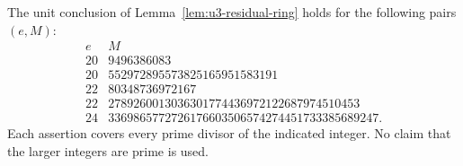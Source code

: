 \begin{proposition}\label{prop:u3-minus7-higher3}
The unit conclusion of Lemma~\ref{lem:u3-residual-ring} holds for
the following pairs $(e,M)$:
\[
 \begin{array}{c|l}
 e&M\\ \hline
 20&9496386083\\
 20&552972895573825165951583191\\
 22&80348736972167\\
 22&2789260013036301774436972122687974510453\\
 24&3369865772726176603506574274451733385689247.
 \end{array}
 \tag{UR.8}
\]
Each assertion covers every prime divisor of the indicated
integer. No claim that the larger integers are prime is used.
\end{proposition}

